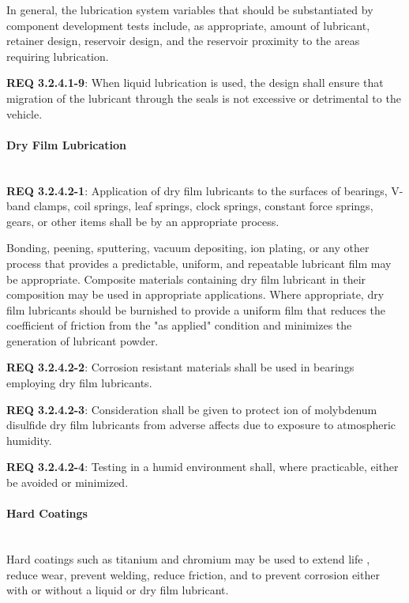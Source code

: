 \documentclass[12pt]{article}
\begin{document}
In general, the lubrication system variables that should be substantiated by component development tests include, as appropriate, amount of lubricant, retainer design, reservoir design, and the reservoir proximity to the areas requiring lubrication. 

\noindent \textbf{REQ 3.2.4.1-9}: When liquid lubrication is used, the design shall ensure that migration of the lubricant through the seals is not excessive or detrimental to the vehicle.


\paragraph{Dry Film Lubrication} \mbox{} \\ %
\noindent \textbf{REQ 3.2.4.2-1}: Application of dry film lubricants to the surfaces of bearings, V-band clamps, coil springs, leaf springs, clock springs, constant force springs, gears, or other items shall be by an appropriate process.

Bonding, peening, sputtering, vacuum depositing, ion plating, or any other process that provides a predictable, uniform, and repeatable lubricant film may be appropriate. 
Composite materials containing dry film lubricant in their composition may be used in appropriate applications. 
Where appropriate, dry film lubricants should be burnished to provide a uniform film that reduces the coefficient of friction from the "as applied" condition and minimizes the generation of lubricant powder.

\noindent \textbf{REQ 3.2.4.2-2}: Corrosion resistant materials shall be used in bearings employing dry film lubricants. 

\noindent \textbf{REQ 3.2.4.2-3}: Consideration shall be given to protect ion of molybdenum disulfide dry film lubricants from adverse affects due to exposure to atmospheric humidity.

\noindent \textbf{REQ 3.2.4.2-4}: Testing in a humid environment shall, where practicable, either be avoided or minimized.


\paragraph{Hard Coatings} \mbox{} \\ %
Hard coatings such as titanium and chromium may be used to extend life , reduce wear, prevent welding, reduce friction, and to prevent corrosion either with or without a liquid or dry film lubricant. 
\end{document}
